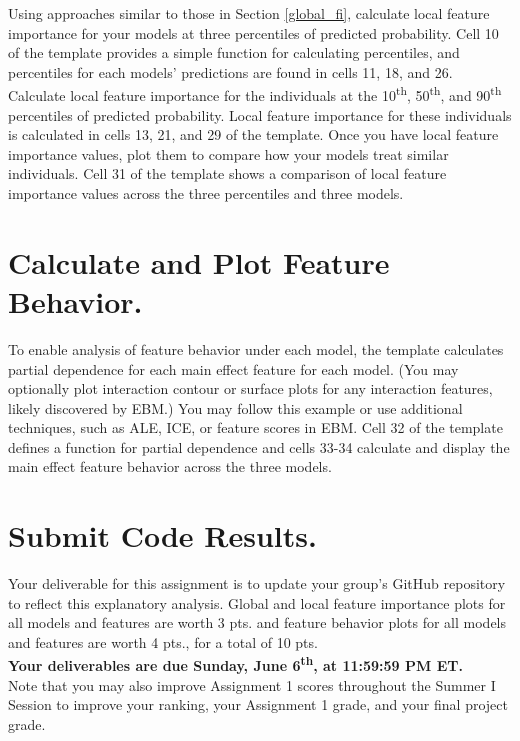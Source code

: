 \documentclass[fleqn]{article}
\begin{document}
Using approaches similar to those in Section \ref{global_fi}, calculate local feature importance for your models at three percentiles of predicted probability. Cell 10 of the template provides a simple function for calculating percentiles, and percentiles for each models' predictions are found in cells 11, 18, and 26.\\

\noindent Calculate local feature importance for the individuals at the 10\textsuperscript{th}, 50\textsuperscript{th}, and 90\textsuperscript{th} percentiles of predicted probability. Local feature importance for these individuals is calculated in cells 13, 21, and 29 of the template. Once you have local feature importance values, plot them to compare how your models treat similar individuals. Cell 31 of the template shows a comparison of local feature importance values across the three percentiles and three models.

\section{Calculate and Plot Feature Behavior.}

To enable analysis of feature behavior under each model, the template calculates partial dependence for each main effect feature for each model. (You may optionally plot interaction contour or surface plots for any interaction features, likely discovered by EBM.) You may follow this example or use additional techniques, such as ALE, ICE, or feature scores in EBM. Cell 32 of the template defines a function for partial dependence and cells 33-34 calculate and display the main effect feature behavior across the three models. 

\section{Submit Code Results.}

Your deliverable for this assignment is to update your group's GitHub repository to reflect this explanatory analysis. Global and local feature importance plots for all models and features are worth 3 pts. and feature behavior plots for all models and features are worth 4 pts., for a total of 10 pts.\\

\noindent \textbf{Your deliverables are due Sunday, June 6\textsuperscript{th}, at 11:59:59 PM ET.}\\

\noindent Note that you may also improve Assignment 1 scores throughout the Summer I Session to improve your ranking, your Assignment 1 grade, and your final project grade.
\end{document}
